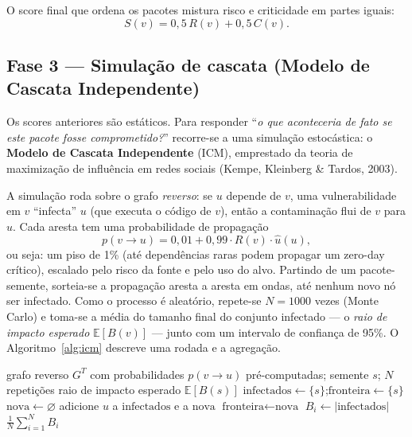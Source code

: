 \documentclass[11pt,a4paper]{article}
\begin{document}
O score final que ordena os pacotes mistura risco e criticidade em partes iguais:
\[
  S(v) = 0{,}5\,R(v) + 0{,}5\,C(v).
\]

\subsection{Fase 3 --- Simulação de cascata (Modelo de Cascata Independente)}

Os scores anteriores são estáticos. Para responder ``\emph{o que aconteceria de
fato se este pacote fosse comprometido?}'' recorre-se a uma simulação estocástica:
o \textbf{Modelo de Cascata Independente} (ICM), emprestado da teoria de maximização
de influência em redes sociais (Kempe, Kleinberg \& Tardos, 2003).

A simulação roda sobre o grafo \emph{reverso}: se $u$ depende de $v$, uma
vulnerabilidade em $v$ ``infecta'' $u$ (que executa o código de $v$), então a
contaminação flui de $v$ para $u$. Cada aresta tem uma probabilidade de propagação
\[
  p(v \to u) = 0{,}01 + 0{,}99 \cdot R(v)\cdot \hat{u}(u),
\]
ou seja: um piso de 1\% (até dependências raras podem propagar um zero-day crítico),
escalado pelo risco da fonte e pelo uso do alvo. Partindo de um pacote-semente,
sorteia-se a propagação aresta a aresta em ondas, até nenhum novo nó ser infectado.
Como o processo é aleatório, repete-se $N=1000$ vezes (Monte Carlo) e toma-se a
média do tamanho final do conjunto infectado --- o \emph{raio de impacto esperado}
$\mathbb{E}[B(v)]$ --- junto com um intervalo de confiança de 95\%. O
Algoritmo~\ref{alg:icm} descreve uma rodada e a agregação.

\begin{algorithm}[t]
\caption{Simulação de cascata (ICM) com estimativa de Monte Carlo}
\label{alg:icm}
\begin{algorithmic}[1]
\Require grafo reverso $G^{T}$ com probabilidades $p(v\to u)$ pré-computadas; semente $s$; $N$ repetições
\Ensure raio de impacto esperado $\mathbb{E}[B(s)]$
  \State $\text{infectados} \gets \{s\}$;\quad $\text{fronteira} \gets \{s\}$
    \State $\text{nova} \gets \varnothing$
          \State adicione $u$ a $\text{infectados}$ e a $\text{nova}$
        \EndIf
      \EndFor
    \EndFor
    \State $\text{fronteira} \gets \text{nova}$
  \EndWhile
  \State $B_i \gets |\text{infectados}|$
\EndFor
\State \Return $\frac{1}{N}\sum_{i=1}^{N} B_i$
\end{algorithmic}
\end{algorithm}
\end{document}
